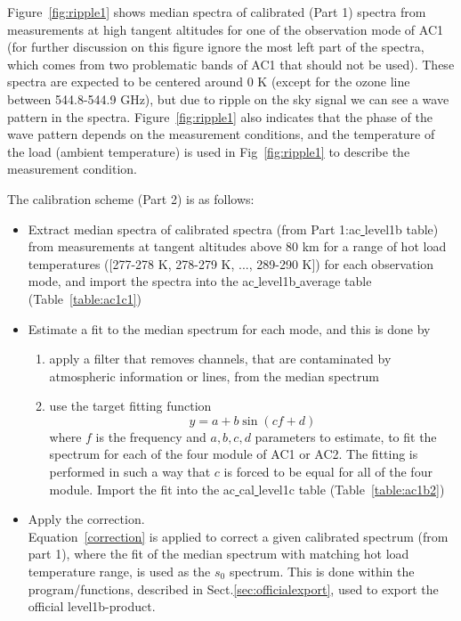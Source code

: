 Figure~\ref{fig:ripple1} shows median spectra of calibrated (Part 1) spectra
from measurements at high tangent altitudes for one of the
observation mode of AC1 (for further discussion on this figure
ignore the most left part of the spectra, which comes from two 
problematic bands of AC1 that should not be used). 
These spectra are expected to be 
centered around 0 K (except for the ozone line between 544.8-544.9 GHz), 
but due to ripple on the sky signal we can see a wave pattern in the spectra.
Figure~\ref{fig:ripple1} also indicates that the phase of the wave pattern
depends on the measurement conditions, and the temperature of
the load (ambient temperature) is used in Fig~\ref{fig:ripple1}
to describe the measurement condition.


The calibration scheme (Part 2) is as follows:
\begin{itemize}
\item Extract median spectra of calibrated spectra 
(from Part 1:ac\underline{ }level1b table) 
from measurements at tangent altitudes above 80 km for a range of hot load 
temperatures ([277-278 K, 278-279 K, ..., 289-290 K]) 
for each observation mode, and import the spectra
into the ac\underline{ }level1b\underline{ }average table
(Table~\ref{table:ac1c1})
\item Estimate a fit to the median spectrum for each mode, and this is done
by
\begin{enumerate}
\item apply a filter that removes channels, that are contaminated by 
atmospheric information or lines, from the median spectrum 
\item use the target fitting function  
\begin{equation}
y=a+ b\sin(cf+d)
\end{equation}
where \(f\) is the frequency and \(a,b,c,d\) parameters to estimate,
to fit the spectrum for each of the four module of AC1 or AC2.
The fitting is performed in such a way that \(c\) is forced 
to be equal for all of the four module. 
Import the fit into the ac\underline{ }cal\underline{ }level1c
table (Table~\ref{table:ac1b2})
\end{enumerate}
\item Apply the correction.\\
Equation~\ref{correction} is applied to correct a given calibrated 
spectrum (from part 1), where the fit of the median spectrum
with matching hot load temperature range, is used as the \(s_{0}\)
spectrum. 
This is done within the program/functions, described in
Sect.\ref{sec:officialexport}, used to export the official
level1b-product.  
\end{itemize}



